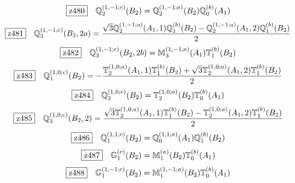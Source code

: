 \documentclass[fleqn,10pt,landscape]{jsarticle}
\begin{document}
\begin{dmath*}
\hspace*{3mm}\fbox{z480}\quad \mathbb{Q}_{2}^{(1,-1;c)}(B_{2})=\mathbb{Q}_{2}^{(1,-1;a)}(B_{2}) \mathbb{Q}_{0}^{(b)}(A_{1})
\end{dmath*}
\begin{dmath*}
\hspace*{3mm}\fbox{z481}\quad \mathbb{Q}_{3}^{(1,-1;c)}(B_{2},2a)=\frac{\sqrt{3} \mathbb{Q}_{2}^{(1,-1;a)}(A_{1},1) \mathbb{Q}_{1}^{(b)}(B_{2}) - \mathbb{Q}_{2}^{(1,-1;a)}(A_{1},2) \mathbb{Q}_{1}^{(b)}(B_{2})}{2}
\end{dmath*}
\begin{dmath*}
\hspace*{3mm}\fbox{z482}\quad \mathbb{Q}_{3}^{(1,-1;c)}(B_{2},2b)=\mathbb{M}_{3}^{(1,-1;a)}(A_{1}) \mathbb{T}_{1}^{(b)}(B_{2})
\end{dmath*}
\begin{dmath*}
\hspace*{3mm}\fbox{z483}\quad \mathbb{Q}_{1}^{(1,0;c)}(B_{2})=- \frac{\mathbb{T}_{2}^{(1,0;a)}(A_{1},1) \mathbb{T}_{1}^{(b)}(B_{2}) + \sqrt{3} \mathbb{T}_{2}^{(1,0;a)}(A_{1},2) \mathbb{T}_{1}^{(b)}(B_{2})}{2}
\end{dmath*}
\begin{dmath*}
\hspace*{3mm}\fbox{z484}\quad \mathbb{Q}_{2}^{(1,0;c)}(B_{2})=\mathbb{T}_{2}^{(1,0;a)}(B_{2}) \mathbb{T}_{0}^{(b)}(A_{1})
\end{dmath*}
\begin{dmath*}
\hspace*{3mm}\fbox{z485}\quad \mathbb{Q}_{3}^{(1,0;c)}(B_{2},2)=\frac{\sqrt{3} \mathbb{T}_{2}^{(1,0;a)}(A_{1},1) \mathbb{T}_{1}^{(b)}(B_{2}) - \mathbb{T}_{2}^{(1,0;a)}(A_{1},2) \mathbb{T}_{1}^{(b)}(B_{2})}{2}
\end{dmath*}
\begin{dmath*}
\hspace*{3mm}\fbox{z486}\quad \mathbb{Q}_{1}^{(1,1;c)}(B_{2})=\mathbb{Q}_{0}^{(1,1;a)}(A_{1}) \mathbb{Q}_{1}^{(b)}(B_{2})
\end{dmath*}
\begin{dmath*}
\hspace*{3mm}\fbox{z487}\quad \mathbb{G}_{1}^{(c)}(B_{2})=\mathbb{M}_{1}^{(a)}(B_{2}) \mathbb{T}_{0}^{(b)}(A_{1})
\end{dmath*}
\begin{dmath*}
\hspace*{3mm}\fbox{z488}\quad \mathbb{G}_{1}^{(1,-1;c)}(B_{2})=\mathbb{M}_{1}^{(1,-1;a)}(B_{2}) \mathbb{T}_{0}^{(b)}(A_{1})
\end{dmath*}
\end{document}
